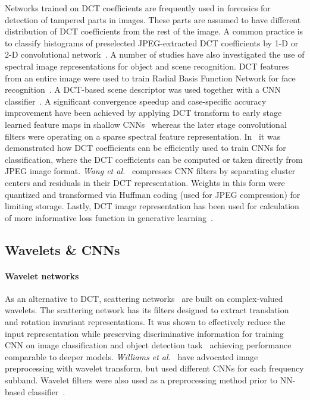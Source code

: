 \documentclass[12pt,a4paper]{article}
\begin{document}
Networks trained on DCT coefficients are frequently used in forensics for detection of tampered parts in images. These parts are assumed to have different distribution of DCT coefficients from the rest of the image.
A common practice is to classify histograms of preselected JPEG-extracted DCT coefficients by 1-D or 2-D convolutional network~\cite{Zheng19}.
A number of studies have also investigated the use of spectral image representations for object and scene recognition. 
DCT features from an entire image were used to train Radial Basis Function Network for face recognition~\cite{Er05}. 
A DCT-based scene descriptor was used together with a CNN classifier~\cite{Farinella15}.
A significant convergence speedup and case-specific accuracy improvement have been achieved by applying DCT transform to early stage learned feature maps in shallow CNNs~\cite{Ghosh16} whereas the later stage convolutional filters were operating on a sparse spectral feature  representation. 
In~\cite{Ulicny17,Gueguen18} it was demonstrated how DCT coefficients can be efficiently used to train CNNs for classification, where the DCT coefficients can be computed or taken directly from JPEG image format. 
\textit{Wang et al.}~\cite{Wang16b} compresses CNN filters by separating cluster centers and residuals in their DCT representation. Weights in this form were quantized and transformed via Huffman coding (used for JPEG compression) for limiting storage. Lastly, DCT image representation has been used for calculation of more informative loss function in generative learning~\cite{Atapour19}. 

\subsection{ Wavelets \& CNNs}

\paragraph{Wavelet networks} 
As an alternative to DCT, scattering networks~\cite{Bruna13} are built on complex-valued wavelets.
The scattering network has its filters designed to extract translation and rotation invariant representations.
It was shown to effectively reduce the input representation while preserving discriminative information for training CNN on image classification and object detection task~\cite{Oyallon18b} achieving performance comparable to deeper models. \textit{Williams et al.}~\cite{Williams16} have advocated image preprocessing with wavelet transform, but used different CNNs for each frequency subband. Wavelet filters were also used as a preprocessing method prior to NN-based classifier~\cite{Said16}.
\end{document}
